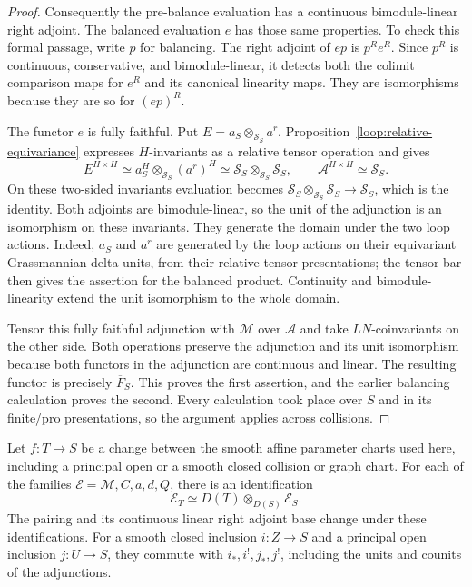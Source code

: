 \begin{proof}
Consequently the pre-balance evaluation has a continuous
bimodule-linear right adjoint.  The balanced evaluation $e$
has those same properties.  To check this formal passage,
write $p$ for balancing.  The right adjoint of $ep$ is
$p^Re^R$.  Since $p^R$ is continuous, conservative, and
bimodule-linear, it detects both the colimit comparison maps
for $e^R$ and its canonical linearity maps.  They are
isomorphisms because they are so for $(ep)^R$.

The functor $e$ is fully faithful.  Put
$E=a_S\otimes_{\mathcal S_S}a^r$.  Proposition~\ref{loop:relative-equivariance}
expresses $H$-invariants as a relative tensor operation and gives
\[
 E^{H\times H}\simeq
    a_S^H\otimes_{\mathcal S_S}(a^r)^H
       \simeq\mathcal S_S\otimes_{\mathcal S_S}\mathcal S_S,
 \qquad \mathcal A^{H\times H}\simeq\mathcal S_S.
\]
On these two-sided invariants evaluation becomes
$\mathcal S_S\otimes_{\mathcal S_S}\mathcal S_S\to\mathcal S_S$,
which is the identity.  Both adjoints are bimodule-linear,
so the unit of the adjunction is an isomorphism on these
invariants.  They generate the domain under the two loop
actions.  Indeed, $a_S$ and $a^r$ are generated by the loop
actions on their equivariant Grassmannian delta units, from
their relative tensor presentations; the tensor bar then
gives the assertion for the balanced product.  Continuity
and bimodule-linearity extend the unit isomorphism to the
whole domain.

Tensor this fully faithful adjunction with $\mathcal M$ over
$\mathcal A$ and take $LN$-coinvariants on the other side.
Both operations preserve the adjunction and its unit
isomorphism because both functors in the adjunction are
continuous and linear.  The resulting functor is precisely
$\overline F_S$.  This proves the first assertion, and the
earlier balancing calculation proves the second.  Every
calculation took place over $S$ and in its finite/pro
presentations, so the argument applies across collisions.
\end{proof}

\begin{corollary}
\label{loop:parameter-operations}
Let $f:T\to S$ be a change between the smooth affine parameter charts
used here, including a principal open or a smooth closed collision or
graph chart.  For each of the families
$\mathcal E=\mathcal M,C,a,d,Q$, there is an identification
\[
             \mathcal E_T\simeq
                   D(T)\otimes_{D(S)}\mathcal E_S.
\]
The pairing and its continuous linear right adjoint base change under
these identifications.  For a smooth closed inclusion $i:Z\to S$ and a
principal open inclusion $j:U\to S$, they commute with
$i_*,i^!,j_*,j^!$, including the units and counits of the adjunctions.
\end{corollary}

